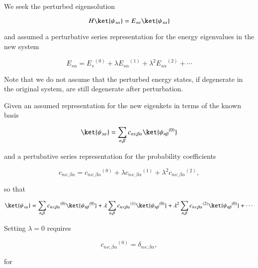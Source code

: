 We seek the perturbed eigensolution

\begin{equation}\label{eqn:qmTwoL5a:50}
H \ket{\psi_{s \alpha}} = E_{s \alpha} \ket{\psi_{s \alpha}}
\end{equation}

and assumed a perturbative series representation for the energy eigenvalues in the new system

\begin{equation}\label{eqn:qmTwoL5a:70}
E_{s \alpha} = {E_s}^{(0)} + \lambda {E_{s \alpha}}^{(1)} + \lambda^2 {E_{s \alpha}}^{(2)} + \cdots
\end{equation}

Note that we do not assume that the perturbed energy states, if degenerate in the original system, are still degenerate after perturbation.

Given an assumed representation for the new eigenkets in terms of the known basis

\begin{equation}\label{eqn:qmTwoL5a:90}
\ket{\psi_{s \alpha}} = \sum_{n, \beta} c_{ns;\beta \alpha} \ket{{\psi_{n \beta}}^{(0)}} 
\end{equation}

and a pertubative series representation for the probability coefficients

\begin{equation}\label{eqn:qmTwoL5a:110}
c_{ns;\beta \alpha} = {c_{ns;\beta \alpha}}^{(0)} + \lambda {c_{ns;\beta \alpha}}^{(1)} + \lambda^2 {c_{ns;\beta \alpha}}^{(2)},
\end{equation}

so that 

\begin{equation}\label{eqn:qmTwoL5a:130}
\ket{\psi_{s \alpha}} = 
\sum_{n, \beta} {c_{ns;\beta \alpha}}^{(0)} \ket{{\psi_{n \beta}}^{(0)}} 
+
\lambda
\sum_{n, \beta} {c_{ns;\beta \alpha}}^{(1)} \ket{{\psi_{n \beta}}^{(0)}} 
+ 
\lambda^2
\sum_{n, \beta} {c_{ns;\beta \alpha}}^{(2)} \ket{{\psi_{n \beta}}^{(0)}} 
+ \cdots
\end{equation}

Setting $\lambda = 0$ requires 

\begin{equation}\label{eqn:qmTwoL5a:150}
{c_{ns;\beta \alpha}}^{(0)} = \delta_{ns;\beta \alpha},
\end{equation}

for

